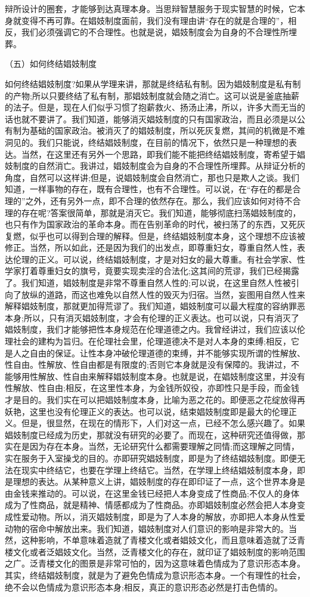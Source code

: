 \documentclass[a4paper]{article}
\begin{document}
辩所设计的圈套，才能够到达真理本身。当思辩智慧服务于现实智慧的时候，它本身就变得不再可靠。在娼妓制度面前，我们没有理由讲“存在的就是合理的”，相反，我们必须强调它的不合理性。也就是说，娼妓制度会为自身的不合理性所埋葬。　

（五）如何终结娼妓制度

如何终结娼妓制度?如果从学理来讲，那就是终结私有制。因为娼妓制度是私有制的产物;所以只要终结了私有制，那娼妓制度就会随之消亡。这可以说是釜底抽薪的法子。但是，现在人们似乎习惯了抱薪救火、扬汤止沸，所以，许多大而无当的话也就不要讲了。我们知道，能够消灭娼妓制度的只有国家政治，而且必须是以公有制为基础的国家政治。被消灭了的娼妓制度，所以死灰复燃，其间的机微是不难洞见的。我们只能说，终结娼妓制度，在目前的情况下，依然只是一种理想的表达。当然，在这里还有另外一个思路，即我们能不能把终结娼妓制度，寄希望于娼妓制度的自然消亡。我讲过，娼妓制度会为自身的不合理性所埋葬。从辩证分析的角度，自然可以这样讲;但是，说娼妓制度会自然消亡，那也只是欺人之谈。我们知道，一样事物的存在，既有合理性，也有不合理性。可以说，在“存在的都是合理的”之外，还有另外一点，即不合理的依然存在。那么，我们应该如何对待不合理的存在呢?答案很简单，那就是消灭它。我们知道，能够彻底扫荡娼妓制度的，也只有作为国家政治的革命本身。而在告别革命的时代，被扫荡了的东西，又死灰复燃，似乎也可以得到合理的解释。但是，终结娼妓制度本身，这个理想不应该被修正。当然，所以如此，还是因为我们的出发点，即尊重妇女，尊重自然人性，表达伦理的正义。可以说，终结娼妓制度，才是对妇女的最大尊重。有社会学家、性学家打着尊重妇女的旗号，竟要实现卖淫的合法化;这其间的荒谬，我们已经揭露了。我们知道，娼妓制度是非常不尊重自然人性的;可以说，在这里自然人性被引向了放纵的道路，而这也难免以自然人性的毁灭为归宿。当然，妄图用自然人性来解释娼妓制度，那就更加得荒谬了。我们知道，娼妓制度可以最大程度的容纳罪恶本身;所以，只有消灭娼妓制度，才会有伦理的正义表达。也可以说，只有消灭了娼妓制度，我们才能够把性本身规范在伦理道德之内。我曾经讲过，我们应该以伦理社会的建构为旨归。在伦理社会里，伦理道德决不是对人本身的束缚;相反，它是人之自由的保证。让性本身冲破伦理道德的束缚，并不能够实现所谓的性解放、性自由。性解放、性自由都是有限度的;否则它本身就是没有保障的。我讲过，不能够用性解放、性自由来解释娼妓制度本身。也就是说，在娼妓制度这里，并没有性解放、性自由;相反，在这里性本身，为金钱所奴役，亦即性只是手段，而金钱才是目的。我们实在可以把娼妓制度本身，比喻为恶之花的。即便恶之花绽放得再妖艳，这里也没有伦理正义的表达。也可以说，结束娼妓制度即是最大的伦理正义。但是，很显然，在现在的情形下，人们对这一点，已经不怎么感兴趣了。如果娼妓制度已经成为历史，那就没有研究的必要了。而现在，这种研究还值得做，那实在是因为存在本身。当然，无论研究什么都需要理解之同情;而这理解之同情，实在服务于入室操戈的目的。亦即研究娼妓制度，即是为了终结娼妓制度。即便无法在现实中终结它，也要在学理上终结它。当然，在学理上终结娼妓制度本身，即是理想的表达。从某种意义上讲，娼妓制度的存在即印证了一点，这个世界本身是由金钱来推动的。可以说，在这里金钱已经把人本身变成了性商品;不仅人的身体成为了性商品，就是精神、情感都成为了性商品。亦即娼妓制度必然会把人本身变成性爱动物。所以，消灭娼妓制度，即是为了人本身的解放，亦即把人本身从性爱动物的宿命中解放出来。我们知道，娼妓制度对人们意识的影响是非常大的。当然，这种影响，不单意味着造就了青楼文化或者娼妓文化，而且意味着造就了泛青楼文化或者泛娼妓文化。当然，泛青楼文化的存在，就印证了娼妓制度的影响范围之广。泛青楼文化的图景是非常可怕的，因为这意味着色情成为了意识形态本身。其实，终结娼妓制度，就是为了避免色情成为意识形态本身。一个有理性的社会，绝不会以色情成为意识形态本身;相反，真正的意识形态必然是打击色情的。
\end{document}

